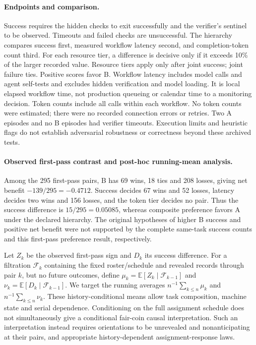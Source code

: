 \paragraph{Endpoints and comparison.}
Success requires the hidden checks to exit successfully and the verifier's
sentinel to be observed. Timeouts and failed checks are unsuccessful.
The hierarchy compares success first, measured workflow latency second,
and completion-token count third. For each resource tier, a difference
is decisive only if it exceeds 10\% of the larger recorded value.
Resource tiers apply only after joint success; joint failure ties.
Positive scores favor B. Workflow latency includes model calls and
agent self-tests and excludes hidden verification and model loading.
It is local elapsed workflow time, not production queueing or calendar
time to a monitoring decision. Token counts include all calls within
each workflow. No token counts were estimated; there were no recorded
connection errors or retries. Two A episodes and no B episodes had
verifier timeouts. Execution limits and heuristic flags do not establish
adversarial robustness or correctness beyond these archived tests.

\begin{table}[h]
\centering\small
\caption{Observed resources across all 591 tasks per workflow. A is
single shot; B uses self-tests and repair. Hidden verification is excluded
from workflow latency and the self-test execution count.}
\label{tab:open_coding_resources}

\end{table}

\paragraph{Observed first-pass contrast and post-hoc running-mean analysis.}
Among the 295 first-pass pairs, B has 69 wins, 18 ties and 208 losses,
giving net benefit $-139/295=-0.4712$. Success decides 67 wins and 52
losses, latency decides two wins and 156 losses, and the token tier
decides no pair. Thus the success difference is $15/295=0.05085$,
whereas composite preference favors A under the declared hierarchy.
The original hypotheses of higher B success and positive net benefit
were not supported by the complete same-task success counts and this
first-pass preference result, respectively.

Let $Z_k$ be the observed first-pass sign and $D_k$ its success difference.
For a filtration $\mathcal F_k$ containing the fixed roster/schedule and
revealed records through pair $k$, but no future outcomes, define
$\mu_k=\mathbb E[Z_k\mid\mathcal F_{k-1}]$ and
$\nu_k=\mathbb E[D_k\mid\mathcal F_{k-1}]$. We target the running
averages $n^{-1}\sum_{k\leq n}\mu_k$ and
$n^{-1}\sum_{k\leq n}\nu_k$. These history-conditional means allow
task composition, machine state and serial dependence. Conditioning on
the full assignment schedule does not simultaneously give a conditional
fair-coin causal interpretation. Such an interpretation instead requires
orientations to be unrevealed and nonanticipating at their pairs, and
appropriate history-dependent assignment-response laws.


